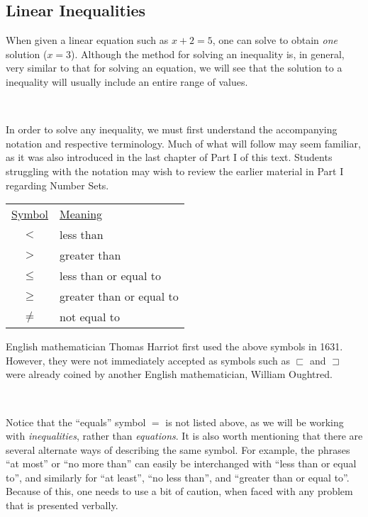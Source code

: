 {}\par

\subsection{Linear Inequalities}

When given a linear equation such as $x+2=5$, one can solve to obtain \textit{one} solution ($x=3$).  Although the method for solving an inequality is, in general, very similar to that for solving an equation, we will see that the solution to a inequality will usually include an entire range of values.\par
~\par
In order to solve any inequality, we must first understand the accompanying notation and respective terminology.  Much of what will follow may seem familiar, as it was also introduced in the last chapter of Part I of this text.  Students struggling with the notation may wish to review the earlier material in Part I regarding Number Sets.

\begin{center}
\begin{tabular}{cl}
\underline{Symbol} & \underline{Meaning}\\
$<$ & less than\\
$>$ & greater than\\
$\leq$ & less than or equal to\\
$\geq$ & greater than or equal to\\
$\neq$ & not equal to
\end{tabular}
\end{center}

{} English mathematician Thomas Harriot first used the above symbols in 1631.  However, they were not immediately accepted as symbols such as $\sqsubset$ and $\sqsupset$ were already coined by another English mathematician, William Oughtred.\par
~\par
Notice that the ``equals'' symbol $=$ is not listed above, as we will be working with \textit{inequalities}, rather than \textit{equations}.  It is also worth mentioning that there are several alternate ways of describing the same symbol.  For example, the phrases ``at most'' or ``no more than'' can easily be interchanged with ``less than or equal to'', and similarly for ``at least'', ``no less than'', and ``greater than or equal to''.  Because of this, one needs to use a bit of caution, when faced with any problem that is presented verbally. \par

